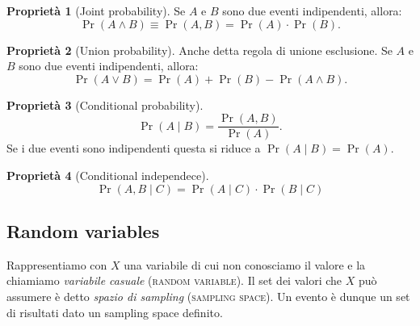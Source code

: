 \documentclass[10pt]{article}
\DeclareMathOperator{\pr}{Pr}
\newcommand{\im}[1]{\textsc{#1}}
\newcommand{\et}{\wedge}
\newcommand{\orr}{\vee}
\newcommand{\cond}{\mid}
\newcommand{\pare}[1]{
	\ensuremath{\left(#1\right)}
}
\theoremstyle{definition}
\newtheorem{property}{Proprietà}[subsection]
\begin{document}
\begin{property}[Joint probability]
Se $A$ e $B$ sono due eventi indipendenti, allora:
\begin{equation}
\pr\pare{A\et B} \equiv \pr\pare{A, B} = \pr\pare{A} \cdot \pr\pare{B}.
\end{equation}
\end{property}

\begin{property}[Union probability]
Anche detta regola di unione esclusione. Se $A$ e $B$ sono due eventi indipendenti, allora:
\begin{equation}
\pr\pare{A\orr B} = \pr\pare{A} + \pr\pare{B} - \pr\pare{A\et B}.
\end{equation}
\end{property}

\begin{property}[Conditional probability]
\begin{equation}
\pr\pare{A\cond B} = \frac{\pr\pare{A, B}}{\pr\pare{A}}.
\end{equation}
Se i due eventi sono indipendenti questa si riduce a $\pr\pare{A\cond B} = \pr\pare{A}$.
\end{property}

\begin{property}[Conditional independece]
\begin{equation}
\pr\pare{A, B \cond C} = \pr\pare{A\cond C} \cdot \pr\pare{B\cond C}
\end{equation}
\end{property}

\subsection{Random variables}
Rappresentiamo con $X$ una variabile di cui non conosciamo il valore e la chiamiamo \textit{variabile casuale} (\im{random variable}). Il set dei valori che $X$ può assumere è detto \textit{spazio di sampling} (\im{sampling space}). Un evento è dunque un set di risultati dato un sampling space definito.
\end{document}
